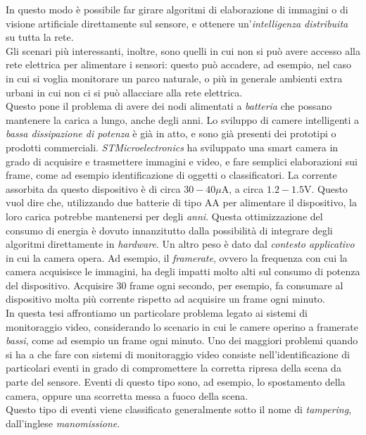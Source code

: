 In questo modo \`e possibile far girare algoritmi di elaborazione di immagini o di visione artificiale direttamente sul sensore, e ottenere un'\textit{intelligenza distribuita} su tutta la rete.\\
Gli scenari pi\`u interessanti, inoltre, sono quelli in cui non si pu\`o avere accesso alla rete elettrica per alimentare i sensori: questo pu\`o accadere, ad esempio, nel caso in cui si voglia monitorare un parco naturale, o pi\`u in generale ambienti extra urbani in cui non ci si pu\`o allacciare alla rete elettrica.\\
Questo pone il problema di avere dei nodi alimentati a \textit{batteria} che possano mantenere la carica a lungo, anche degli anni.
Lo sviluppo di camere intelligenti a \textit{bassa dissipazione di potenza} \`e gi\`a in atto, e sono gi\`a presenti dei prototipi o prodotti commerciali.
\textit{STMicroelectronics} ha sviluppato una smart camera in grado di acquisire e trasmettere immagini e video, e fare semplici elaborazioni sui frame, come ad esempio identificazione di oggetti o classificatori.
La corrente assorbita da questo dispositivo \`e di circa $30-40 \mu \text{A}$, a circa $1.2-1.5 \text{V}$.
Questo vuol dire che, utilizzando due batterie di tipo AA per alimentare il dispositivo, la loro carica potrebbe mantenersi per degli \textit{anni}.
Questa ottimizzazione del consumo di energia \`e dovuto innanzitutto dalla possibilit\`a di integrare degli algoritmi direttamente in \textit{hardware}.
Un altro peso \`e dato dal \textit{contesto applicativo} in cui la camera opera.
Ad esempio, il \textit{framerate}, ovvero la frequenza con cui la camera acquisisce le immagini, ha degli impatti molto alti sul consumo di potenza del dispositivo.
Acquisire $30$ frame ogni secondo, per esempio, fa consumare al dispositivo molta pi\`u corrente rispetto ad acquisire un frame ogni minuto.\\
In questa tesi affrontiamo un particolare problema legato ai sistemi di monitoraggio video, considerando lo scenario in cui le camere operino a framerate \textit{bassi}, come ad esempio un frame ogni minuto.
Uno dei maggiori problemi quando si ha a che fare con sistemi di monitoraggio video consiste nell'identificazione di particolari eventi in grado di compromettere la corretta ripresa della scena da parte del sensore.
Eventi di questo tipo sono, ad esempio, lo spostamento della camera, oppure una scorretta messa a fuoco della scena.\\
Questo tipo di eventi viene classificato generalmente sotto il nome di \textit{tampering}, dall'inglese \textit{manomissione}.
